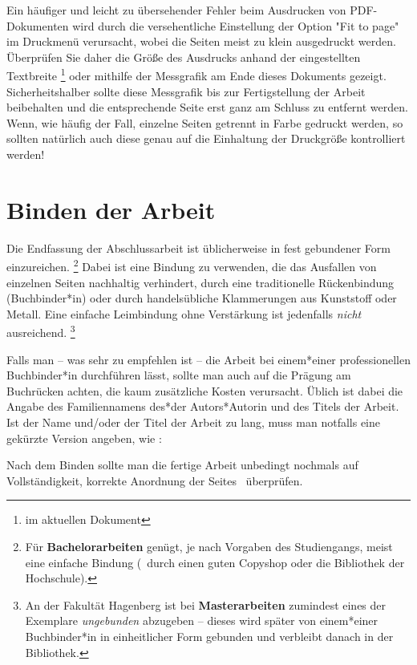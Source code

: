 Ein häufiger und leicht zu übersehender Fehler beim Ausdrucken von
PDF-Doku\-menten wird durch die versehentliche Einstellung der Option "Fit to
page" im Druckmenü verursacht, wobei die Seiten meist zu klein ausgedruckt
werden. Überprüfen Sie daher die Größe des Ausdrucks anhand der eingestellten
Textbreite%
\footnote{\Convert[unit=mm]{\the\textwidth}	im aktuellen Dokument} %
oder mithilfe der Messgrafik am Ende dieses Dokuments gezeigt.
Sicherheitshalber sollte diese Messgrafik bis zur Fertigstellung der
Arbeit beibehalten und die entsprechende Seite erst ganz am Schluss zu
entfernt werden. Wenn, wie häufig der Fall, einzelne Seiten getrennt in Farbe
gedruckt werden, so sollten natürlich auch diese genau auf die Einhaltung der
Druckgröße kontrolliert werden!


\section{Binden der Arbeit}

Die Endfassung der Abschlussarbeit ist üblicherweise in fest gebundener Form
einzureichen.%
\footnote{Für \textbf{Bachelorarbeiten} genügt, je nach Vorgaben des
Studiengangs, meist eine einfache Bindung (\zB\ durch einen guten Copyshop
oder die Bibliothek der Hochschule).}
Dabei ist eine Bindung zu verwenden, die das Ausfallen von einzelnen Seiten
nachhaltig verhindert, \zB durch eine traditionelle Rückenbindung
(Buchbinder*in) oder durch handelsübliche Klammerungen aus Kunststoff oder
Metall. Eine einfache Leimbindung ohne Verstärkung ist jedenfalls
\emph{nicht} ausreichend.%
\footnote{An der Fakultät Hagenberg ist bei \textbf{Masterarbeiten} zumindest
eines der Exemplare \emph{ungebunden} abzugeben -- dieses wird später von
einem*einer Buchbinder*in in einheitlicher Form gebunden und verbleibt danach
in der Bibliothek.}

Falls man -- was sehr zu empfehlen ist -- die Arbeit bei einem*einer
professionellen Buchbinder*in durchführen lässt, sollte man auch auf die
Prägung am Buchrücken achten, die kaum zusätzliche Kosten verursacht. Üblich
ist dabei die Angabe des Familiennamens des*der Autors*Autorin und des Titels
der Arbeit. Ist der Name und/oder der Titel der Arbeit zu lang, muss man 
notfalls eine gekürzte Version angeben, wie \zB:
%
\begin{center}
	\setlength{\fboxsep}{3mm}
\end{center}
%
Nach dem Binden sollte man die fertige Arbeit unbedingt nochmals auf 
Vollständigkeit, korrekte Anordnung der Seites \etc\ überprüfen.



